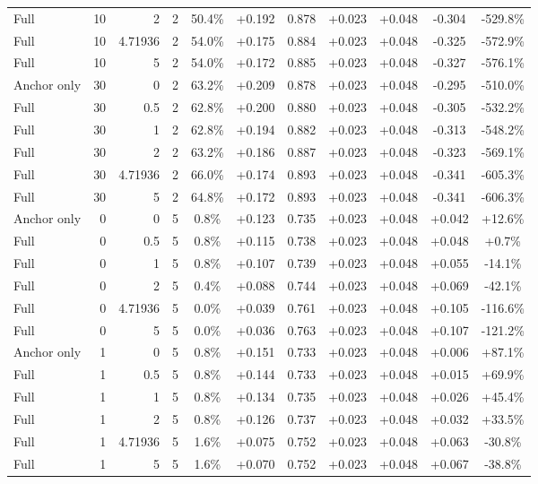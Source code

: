 \begin{table}[htbp]
\begin{tabular}{lrrrccccccc}
Full & 10 & 2 & 2 & 50.4\% & +0.192 & 0.878 & +0.023 & +0.048 & -0.304 & -529.8\% \\
Full & 10 & 4.71936 & 2 & 54.0\% & +0.175 & 0.884 & +0.023 & +0.048 & -0.325 & -572.9\% \\
Full & 10 & 5 & 2 & 54.0\% & +0.172 & 0.885 & +0.023 & +0.048 & -0.327 & -576.1\% \\
Anchor only & 30 & 0 & 2 & 63.2\% & +0.209 & 0.878 & +0.023 & +0.048 & -0.295 & -510.0\% \\
Full & 30 & 0.5 & 2 & 62.8\% & +0.200 & 0.880 & +0.023 & +0.048 & -0.305 & -532.2\% \\
Full & 30 & 1 & 2 & 62.8\% & +0.194 & 0.882 & +0.023 & +0.048 & -0.313 & -548.2\% \\
Full & 30 & 2 & 2 & 63.2\% & +0.186 & 0.887 & +0.023 & +0.048 & -0.323 & -569.1\% \\
Full & 30 & 4.71936 & 2 & 66.0\% & +0.174 & 0.893 & +0.023 & +0.048 & -0.341 & -605.3\% \\
Full & 30 & 5 & 2 & 64.8\% & +0.172 & 0.893 & +0.023 & +0.048 & -0.341 & -606.3\% \\
Anchor only & 0 & 0 & 5 & 0.8\% & +0.123 & 0.735 & +0.023 & +0.048 & +0.042 & +12.6\% \\
Full & 0 & 0.5 & 5 & 0.8\% & +0.115 & 0.738 & +0.023 & +0.048 & +0.048 & +0.7\% \\
Full & 0 & 1 & 5 & 0.8\% & +0.107 & 0.739 & +0.023 & +0.048 & +0.055 & -14.1\% \\
Full & 0 & 2 & 5 & 0.4\% & +0.088 & 0.744 & +0.023 & +0.048 & +0.069 & -42.1\% \\
Full & 0 & 4.71936 & 5 & 0.0\% & +0.039 & 0.761 & +0.023 & +0.048 & +0.105 & -116.6\% \\
Full & 0 & 5 & 5 & 0.0\% & +0.036 & 0.763 & +0.023 & +0.048 & +0.107 & -121.2\% \\
Anchor only & 1 & 0 & 5 & 0.8\% & +0.151 & 0.733 & +0.023 & +0.048 & +0.006 & +87.1\% \\
Full & 1 & 0.5 & 5 & 0.8\% & +0.144 & 0.733 & +0.023 & +0.048 & +0.015 & +69.9\% \\
Full & 1 & 1 & 5 & 0.8\% & +0.134 & 0.735 & +0.023 & +0.048 & +0.026 & +45.4\% \\
Full & 1 & 2 & 5 & 0.8\% & +0.126 & 0.737 & +0.023 & +0.048 & +0.032 & +33.5\% \\
Full & 1 & 4.71936 & 5 & 1.6\% & +0.075 & 0.752 & +0.023 & +0.048 & +0.063 & -30.8\% \\
Full & 1 & 5 & 5 & 1.6\% & +0.070 & 0.752 & +0.023 & +0.048 & +0.067 & -38.8\% \\

\end{tabular}
\end{table}
